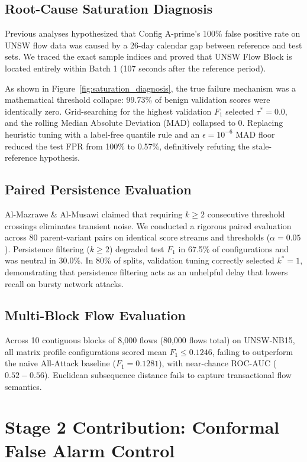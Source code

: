 \documentclass[10pt,twocolumn]{article}
\begin{document}
\subsection{Root-Cause Saturation Diagnosis}
Previous analyses hypothesized that Config A-prime's 100\% false positive rate on UNSW flow data was caused by a 26-day calendar gap between reference and test sets. We traced the exact sample indices and proved that UNSW Flow Block is located entirely within Batch 1 (107 seconds after the reference period). 

As shown in Figure~\ref{fig:saturation_diagnosis}, the true failure mechanism was a mathematical threshold collapse: 99.73\% of benign validation scores were identically zero. Grid-searching for the highest validation $F_1$ selected $\tau^* = 0.0$, and the rolling Median Absolute Deviation (MAD) collapsed to 0. Replacing heuristic tuning with a label-free quantile rule and an $\epsilon = 10^{-6}$ MAD floor reduced the test FPR from 100\% to 0.57\%, definitively refuting the stale-reference hypothesis.

\subsection{Paired Persistence Evaluation}
Al-Mazrawe \& Al-Musawi \cite{almazrawe2025enhancing} claimed that requiring $k \ge 2$ consecutive threshold crossings eliminates transient noise. We conducted a rigorous paired evaluation across 80 parent-variant pairs on identical score streams and thresholds ($\alpha=0.05$). Persistence filtering ($k \ge 2$) degraded test $F_1$ in 67.5\% of configurations and was neutral in 30.0\%. In 80\% of splits, validation tuning correctly selected $k^* = 1$, demonstrating that persistence filtering acts as an unhelpful delay that lowers recall on bursty network attacks.

\subsection{Multi-Block Flow Evaluation}
Across 10 contiguous blocks of 8,000 flows (80,000 flows total) on UNSW-NB15, all matrix profile configurations scored mean $F_1 \le 0.1246$, failing to outperform the naive All-Attack baseline ($F_1 = 0.1281$), with near-chance ROC-AUC ($0.52 - 0.56$). Euclidean subsequence distance fails to capture transactional flow semantics.

\section{Stage 2 Contribution: Conformal False Alarm Control}
\end{document}
